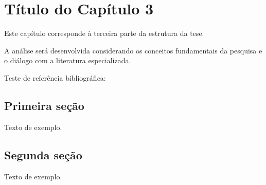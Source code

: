 \chapter{Título do Capítulo 3}

Este capítulo corresponde à terceira parte da estrutura da tese.

A análise será desenvolvida considerando os conceitos fundamentais
da pesquisa e o diálogo com a literatura especializada.

Teste de referência bibliográfica:

\cite{dask3}

\section{Primeira seção}

Texto de exemplo.

\section{Segunda seção}

Texto de exemplo.